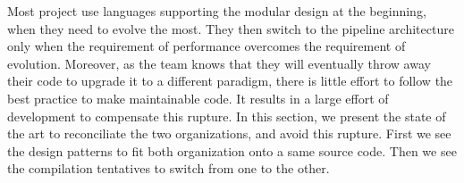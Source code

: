 Most project use languages supporting the modular design at the beginning, when they need to evolve the most.
They then switch to the pipeline architecture only when the requirement of performance overcomes the requirement of evolution.
Moreover, as the team knows that they will eventually throw away their code to upgrade it to a different paradigm, there is little effort to follow the best practice to make maintainable code.
It results in a large effort of development to compensate this rupture.
In this section, we present the state of the art to reconciliate the two organizations, and avoid this rupture.
First we see the design patterns to fit both organization onto a same source code.
Then we see the compilation tentatives to switch from one to the other.